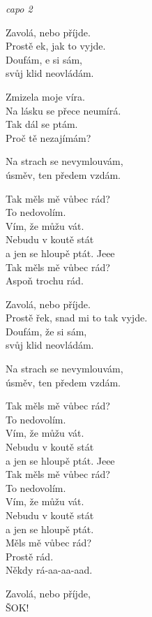 
\re{}\textit{capo 2}

\ve{}
Zavolá, nebo příjde.\\
Prostě ek, jak to vyjde.\\
Doufám, e si sám,\\
svůj klid neovládám.

\ve{}
Zmizela moje víra.\\
Na lásku se přece neumírá.\\
Tak dál se ptám.\\
Proč tě nezajímám?

\re{}
Na strach se nevymlouvám,\\
úsměv, ten předem vzdám.

\cho{}
Tak měls mě vůbec rád?\\
To nedovolím.\\
Vím, že můžu vát.\\
Nebudu v koutě stát\\
a jen se hloupě ptát. Jeee\\
Tak měls mě vůbec rád?\\
Aspoň trochu rád.

\ve{}
Zavolá, nebo příjde.\\
Prostě řek, snad mi to tak vyjde.\\
Doufám, že si sám,\\
svůj klid neovládám.

\re{}
Na strach se nevymlouvám,\\
úsměv, ten předem vzdám.

\cho{}
Tak měls mě vůbec rád?\\
To nedovolím.\\
Vím, že můžu vát.\\
Nebudu v koutě stát\\
a jen se hloupě ptát. Jeee\\
Tak měls mě vůbec rád?\\
To nedovolím.\\
Vím, že můžu vát.\\
Nebudu v koutě stát\\
a jen se hloupě ptát.\\
Měls mě vůbec rád?\\
Prostě rád.\\
Někdy rá-aa-aa-aad.

\ve{}
Zavolá, nebo příjde,\\
ŠOK!

\cho{}
\cho{}

\esong{}